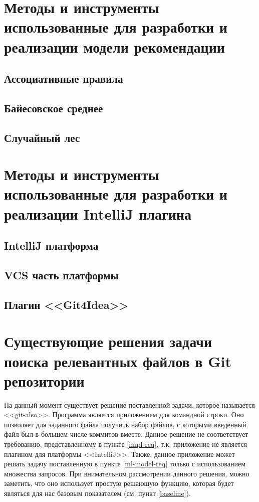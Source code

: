 \section{Методы и инструменты использованные для разработки и реализации модели рекомендации}
    \subsection{Ассоциативные правила}
    \subsection{Байесовское среднее}
    \subsection{Случайный лес}
\section{Методы и инструменты использованные для разработки и реализации IntelliJ плагина}
    \subsection{IntelliJ платформа}
    \subsection{VCS часть платформы}
    \subsection{Плагин <<Git4Idea>>}
\section{Существующие решения задачи поиска релевантных файлов в Git репозитории}
На данный момент существует решение поставленной задачи, которое называется <<git-also>>. Программа является приложением для командной строки. Оно позволяет для заданного файла получить набор файлов, с которыми введенный файл был в большем числе коммитов вместе. Данное решение не соответствует требованию, представленному в пункте \ref{impl-req}, т.к. приложение не является плагином для платформы <<IntelliJ>>. Также, данное приложение может решать задачу поставленную в пункте \ref{ml-model-req} только с использованием множества запросов. При внимательном рассмотрении данного решения, можно заметить, что оно использует простую решающую функцию, которая будет являться для нас базовым показателем (см. пункт \ref{baseline}).
\chapterconclusion